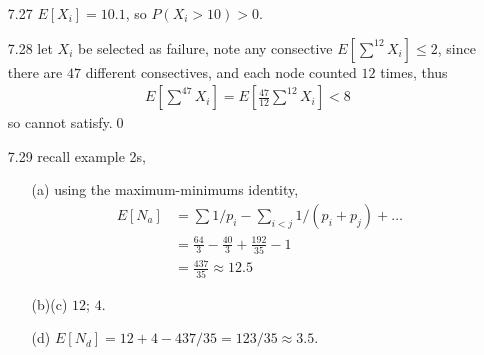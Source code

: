 \documentclass[paper=a4, fontsize=11pt]{scrartcl} %
\numberwithin{equation}{section} %
\numberwithin{figure}{section} %
\numberwithin{table}{section} %
\begin{document}
\begin{itemize}
	\item[7.27] $E[X_i]=10.1$, so $P(X_i>10)>0$.	
	\item[7.28] let $X_i$ be selected as failure, note any consective $E[\sum^{12} X_i]\leq 2$, since there are $47$ different consectives, and each node counted $12$ times, thus
	\begin{align}
		E[\sum^{47} X_i] = E[\frac{47}{12} \sum^{12} X_i] < 8
	\end{align}
	so cannot satisfy.\qed
	\item[7.29] recall example 2s,
	\begin{itemize}
		\item[(a)] using the maximum-minimums identity,
		\begin{align}
			E[N_a] &= \sum 1/p_i - \sum_{i<j} 1/(p_i+p_j)+\dots \\
				&= \frac{64}{3} - \frac{40}{3} + \frac{192}{35} - 1 \\
				&= \frac{437}{35}\approx 12.5
		\end{align}
		\item[(b)(c)] $12$; $4$.
		\item[(d)] $E[N_d]= 12+4 - 437/35 = 123/35\approx 3.5$.
	\end{itemize}
\end{itemize}
\end{document}
